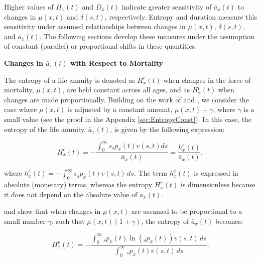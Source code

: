 \documentclass[12pt]{article}
\begin{document}

Higher values of ${H}_{x}(t)$ and ${D}_{x}(t)$ indicate greater sensitivity of $\bar{a}_x(t)$ to changes in $\mu(x,t)$ and $\delta(s,t)$, respectively. Entropy and duration measure this sensitivity under assumed relationships between changes in $\mu(x,t)$, $\delta(s,t)$, and $\bar{a}_x(t)$. The following sections develop these measures under the assumption of constant (parallel) or proportional shifts in these quantities.

\textbf{{Changes in $\bar{a}_x(t)$ with Respect to Mortality}}


The entropy of a life annuity is denoted as ${H}^{c}_{x}(t)$ when changes in the force of mortality, $\mu(x,t)$, are held constant across all ages, and as ${H}^{p}_{x}(t)$ when changes are made proportionally. Building on the work of \citet{Tsai2013a} and \citet{Lin2020}, we consider the case where $\mu(x,t)$ is adjusted by a constant amount, $\mu(x,t) + \gamma$, where $\gamma$ is a small value (see the proof in the Appendix \ref{sec:EntropyConst}). In this case, the entropy of the life annuity, $\bar{a}_x(t)$, is given by the following expression:


\begin{equation}\label{eq:EntropyC}
{H}^{c}_{x}(t) = -\frac{\int_{0}^\infty s {}_sp_x(t) {v}(s,t) ds}{\bar{a}_x(t)}=\frac{{h}^{c}_{x}(t)}{\bar{a}_x(t)},
\end{equation}

where ${h}^{c}_{x}(t)=-\int_{0}^\infty s {}_s p_x(t) {v}(s,t) \, ds$. The term ${h}^{c}_{x}(t)$ is expressed in absolute (monetary) terms, whereas the entropy ${H}^{c}_{x}(t)$ is dimensionless because it does not depend on the absolute value of $\bar{a}_x(t)$.

\citet{Haberman2011} and \citet{Tsai2013a} show that when changes in $\mu(x,t)$ are assumed to be proportional to a small number $\gamma$, such that $\mu(x,t)(1+\gamma)$, the entropy of $\bar{a}_x(t)$ becomes:

\begin{equation} \label{eq:EntropyP}
	{H}^{p}_{x}(t) = -\frac{ \int_{0}^{\infty}{}_s p_x(t)\ln\left({}_s p_x(t)\right) {v}(s,t) \, ds}{\int_0^\infty {}_s p_x(t) {v}(s,t) \, ds}.
\end{equation}
\end{document}
